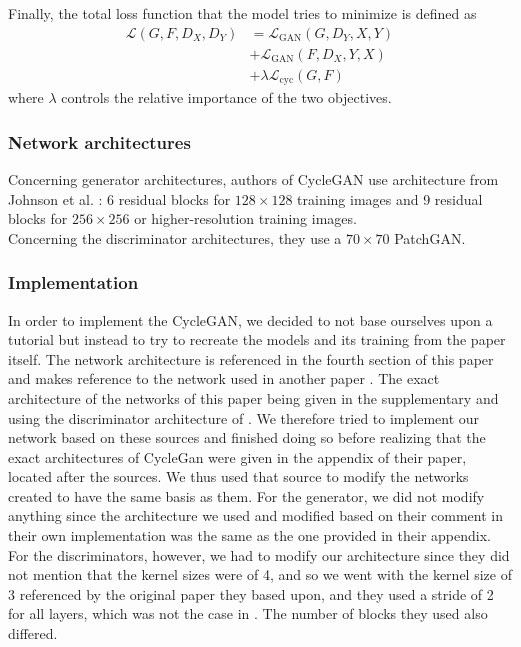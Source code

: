 \documentclass[twocolumn,superscriptaddress,aps, floatfix]{revtex4-1}
\begin{document}
    Finally, the total loss function that the model tries to minimize is defined as
    \begin{align}
        \mathcal{L}\left(G, F, D_{X}, D_{Y}\right) &= \mathcal{L}_{\mathrm{GAN}}\left(G, D_{Y}, X, Y\right)\nonumber\\
        &+ \mathcal{L}_{\mathrm{GAN}}\left(F, D_{X}, Y, X\right)\nonumber\\
        &+ \lambda \mathcal{L}_{\mathrm{cyc}}(G, F)
    \end{align}
    where $\lambda$ controls the relative importance of the two objectives.
    
    \subsubsection{Network architectures}
    
    Concerning generator architectures, authors of CycleGAN use architecture from Johnson et al. \cite{DBLP:journals/corr/JohnsonAL16} : 6 residual blocks for $128 \times 128$ training images and 9 residual blocks for $256 \times 256$ or higher-resolution training images.\\
    
    Concerning the discriminator architectures, they use a $70 \times 70$ PatchGAN.
    
    \subsubsection{Implementation}
    
    In order to implement the CycleGAN, we decided to not base ourselves upon a tutorial but instead to try to recreate the models and its training from the paper \cite{DBLP:journals/corr/ZhuPIE17} itself. The network architecture is referenced in the fourth section of this paper and makes reference to the network used in another paper \cite{DBLP:journals/corr/JohnsonAL16}. The exact architecture of the networks of this paper being given in the supplementary and using the discriminator architecture of \cite{DBLP:journals/corr/LedigTHCATTWS16}. We therefore tried to implement our network based on these sources and finished doing so before realizing that the exact architectures of CycleGan were given in the appendix of their paper, located after the sources. We thus used that source to modify the networks created to have the same basis as them. For the generator, we did not modify anything since the architecture we used and modified based on their comment in their own implementation was the same as the one provided in their appendix. For the discriminators, however, we had to modify our architecture since they did not mention that the kernel sizes were of 4, and so we went with the kernel size of 3 referenced by the original paper they based upon, and they used a stride of 2 for all layers, which was not the case in \cite{DBLP:journals/corr/LedigTHCATTWS16}. The number of blocks they used also differed.\\
    
\end{document}
